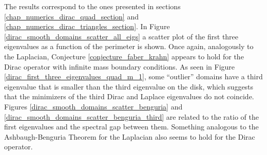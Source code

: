 The results correspond to the ones presented in sections \ref{chap_numerics_dirac_quad_section} and \ref{chap_numerics_dirac_triangles_section}. In Figure \ref{dirac_smooth_domains_scatter_all_eigs} a scatter plot of the first three eigenvalues as a function of the perimeter is shown. Once again, analogously to the Laplacian, Conjecture \ref{conjecture_faber_krahn} appears to hold for the Dirac operator with infinite mass boundary conditions. As seen in Figure \ref{dirac_first_three_eigenvalues_quad_m_1}, some ``outlier'' domains have a third eigenvalue that is smaller than the third eigenvalue on the disk, which suggests that the minimizers of the third Dirac and Laplace eigenvalues do not coincide.
Figures \ref{dirac_smooth_domains_scatter_benguria} and \ref{dirac_smooth_domains_scatter_benguria_third} are related to the ratio of the first eigenvalues and the spectral gap between them. Something analogous to the Ashbaugh-Benguria Theorem for the Laplacian also seems to hold for the Dirac operator.

